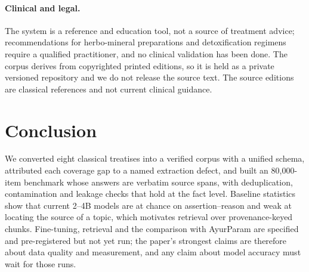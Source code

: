 \documentclass[10pt,twocolumn,letterpaper]{article}
\begin{document}
\paragraph{Clinical and legal.}
The system is a reference and education tool, not a source of treatment advice;
recommendations for herbo-mineral preparations and detoxification regimens require
a qualified practitioner, and no clinical validation has been done. The corpus
derives from copyrighted printed editions, so it is held as a private versioned
repository and we do not release the source text. The source editions are
classical references and not current clinical guidance.

\section{Conclusion}

We converted eight classical treatises into a verified corpus with a unified
schema, attributed each coverage gap to a named extraction defect, and built an
80{,}000-item benchmark whose answers are verbatim source spans, with
deduplication, contamination and leakage checks that hold at the fact level.
Baseline statistics show that current 2--4B models are at chance on
assertion--reason and weak at locating the source of a topic, which motivates
retrieval over provenance-keyed chunks. Fine-tuning, retrieval and the comparison
with AyurParam are specified and pre-registered but not yet run; the paper's
strongest claims are therefore about data quality and measurement, and any claim
about model accuracy must wait for those runs.
\end{document}
